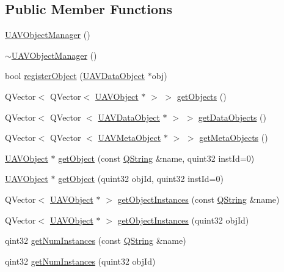 \subsection*{\-Public \-Member \-Functions}
\begin{DoxyCompactItemize}
\item 
\hyperlink{group___u_a_v_objects_plugin_ga407e523ca4304b00cc600c49f110e60a}{\-U\-A\-V\-Object\-Manager} ()
\item 
\hyperlink{group___u_a_v_objects_plugin_ga0b1af95f366fc372f94307f59513933d}{$\sim$\-U\-A\-V\-Object\-Manager} ()
\item 
bool \hyperlink{group___u_a_v_objects_plugin_gad71bd0967de227335d5fec0b599a54e3}{register\-Object} (\hyperlink{class_u_a_v_data_object}{\-U\-A\-V\-Data\-Object} $\ast$obj)
\item 
\-Q\-Vector$<$ \-Q\-Vector$<$ \hyperlink{class_u_a_v_object}{\-U\-A\-V\-Object} $\ast$ $>$ $>$ \hyperlink{group___u_a_v_objects_plugin_ga90cc8567b44fd696df9fffa8a3f24f0c}{get\-Objects} ()
\item 
\-Q\-Vector$<$ \-Q\-Vector\*
$<$ \hyperlink{class_u_a_v_data_object}{\-U\-A\-V\-Data\-Object} $\ast$ $>$ $>$ \hyperlink{group___u_a_v_objects_plugin_gaddd03a2027eb1ac4f3208d3fda7e76c9}{get\-Data\-Objects} ()
\item 
\-Q\-Vector$<$ \-Q\-Vector\*
$<$ \hyperlink{class_u_a_v_meta_object}{\-U\-A\-V\-Meta\-Object} $\ast$ $>$ $>$ \hyperlink{group___u_a_v_objects_plugin_ga8c25b065c3e4f456b2e3a7913f6d764f}{get\-Meta\-Objects} ()
\item 
\hyperlink{class_u_a_v_object}{\-U\-A\-V\-Object} $\ast$ \hyperlink{group___u_a_v_objects_plugin_gada44cdbfa55a281b78d41abcc6834dc0}{get\-Object} (const \hyperlink{group___u_a_v_objects_plugin_gab9d252f49c333c94a72f97ce3105a32d}{\-Q\-String} \&name, quint32 inst\-Id=0)
\item 
\hyperlink{class_u_a_v_object}{\-U\-A\-V\-Object} $\ast$ \hyperlink{group___u_a_v_objects_plugin_ga6d299736b20c625d2553f80123e71e7a}{get\-Object} (quint32 obj\-Id, quint32 inst\-Id=0)
\item 
\-Q\-Vector$<$ \hyperlink{class_u_a_v_object}{\-U\-A\-V\-Object} $\ast$ $>$ \hyperlink{group___u_a_v_objects_plugin_ga575678dce0852cc3843610477ea587ff}{get\-Object\-Instances} (const \hyperlink{group___u_a_v_objects_plugin_gab9d252f49c333c94a72f97ce3105a32d}{\-Q\-String} \&name)
\item 
\-Q\-Vector$<$ \hyperlink{class_u_a_v_object}{\-U\-A\-V\-Object} $\ast$ $>$ \hyperlink{group___u_a_v_objects_plugin_gaa1134c6f38b27868f8f61c6e2aaae4f5}{get\-Object\-Instances} (quint32 obj\-Id)
\item 
qint32 \hyperlink{group___u_a_v_objects_plugin_gab285ecd0299f701264d624cad6e51ef1}{get\-Num\-Instances} (const \hyperlink{group___u_a_v_objects_plugin_gab9d252f49c333c94a72f97ce3105a32d}{\-Q\-String} \&name)
\item 
qint32 \hyperlink{group___u_a_v_objects_plugin_ga22601fef22bd4c4ba1c48e07b70e8ddb}{get\-Num\-Instances} (quint32 obj\-Id)
\end{DoxyCompactItemize}



